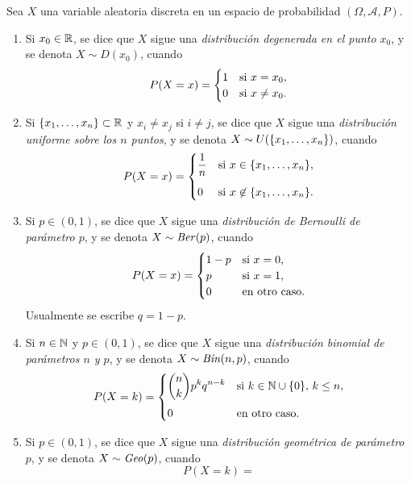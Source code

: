 \documentclass[a4paper, 11pt, extrafontsizes]{memoir}
\begin{document}
\begin{definition}
    Sea $X$ una variable aleatoria discreta en un espacio de probabilidad $(\Omega,\mathcal{A},P)$.
    \begin{enumerate}
        \item Si $x_0 \in \mathbb R$, se dice que $X$ sigue una \emph{{distribución degenerada en el punto ${x_0}$}}, y se denota $X \sim D(x_0)$, cuando
        \[P(X = x) = \begin{cases}
            1 & $si$ \ x = x_0, \\
            0 & $si$ \ x \neq x_0.
        \end{cases}\]
        \item Si $\{x_1,\mathellipsis,x_n\} \subset \mathbb R$ y $x_i \neq x_j$ si $i \neq j$, se dice que $X$ sigue una \emph{{distribución uniforme sobre los $n$ puntos}}, y se denota $X \sim U(\{x_1,\mathellipsis,x_n\})$, cuando
        \[P(X=x) = \begin{cases}
            \displaystyle \frac{1}{n} & $si$ \ x \in \{x_1,\mathellipsis,x_n\}, \\[10pt]
            0 & $si$ \ x \not\in \{x_1,\mathellipsis,x_n\}.
        \end{cases}\]
        \item Si $p \in (0,1)$, se dice que $X$ sigue una \emph{{distribución de Bernoulli de parámetro ${p}$}}, y se denota $X \sim \textup{\emph{Ber}}(p)$, cuando
        \[P(X=x) =
            \begin{cases}
            1-p & $si$ \ x = 0, \\
            p & $si$ \ x = 1, \\
            0 & $en otro caso$.
            \end{cases}
        \]
        Usualmente se escribe $q = 1-p$.
        \item Si $n \in \mathbb N$ y $p \in (0,1)$, se dice que $X$ sigue una \emph{{distribución binomial de parámetros ${n}$ y ${p}$}}, y se denota $X \sim \textup{\emph{Bin}}(n,p)$, cuando
        \[P(X=k) =
            \begin{cases}
            \displaystyle\binom{n}{k}p^kq^{n-k} & $si$ \ k \in \N \cup \{0\}, \, k \leq n, \\[10pt]
            0 & $en otro caso$.
            \end{cases}
        \]
        \item Si $p \in (0,1)$, se dice que $X$ sigue una \emph{{distribución geométrica de parámetro ${p}$}}, y se denota $X \sim \textup{\emph{Geo}}(p)$, cuando
        \[P(X=k) =
\]
\end{enumerate}
\end{definition}
\end{document}
